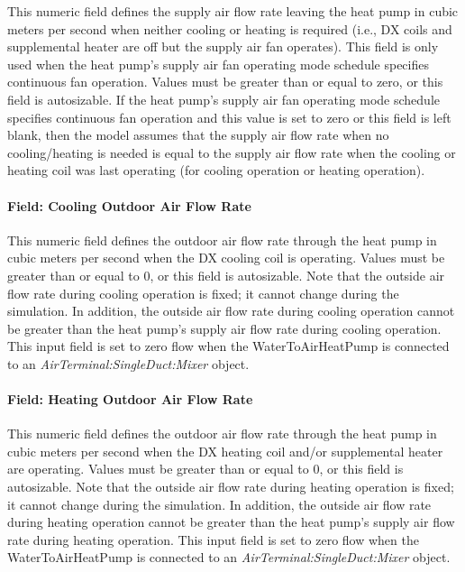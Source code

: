 This numeric field defines the supply air flow rate leaving the heat pump in cubic meters per second when neither cooling or heating is required (i.e., DX coils and supplemental heater are off but the supply air fan operates). This field is only used when the heat pump's supply air fan operating mode schedule specifies continuous fan operation. Values must be greater than or equal to zero, or this field is autosizable. If the heat pump's supply air fan operating mode schedule specifies continuous fan operation and this value is set to zero or this field is left blank, then the model assumes that the supply air flow rate when no cooling/heating is needed is equal to the supply air flow rate when the cooling or heating coil was last operating (for cooling operation or heating operation).

\paragraph{Field: Cooling Outdoor Air Flow Rate}\label{field-cooling-outdoor-air-flow-rate-2}

This numeric field defines the outdoor air flow rate through the heat pump in cubic meters per second when the DX cooling coil is operating. Values must be greater than or equal to 0, or this field is autosizable. Note that the outside air flow rate during cooling operation is fixed; it cannot change during the simulation. In addition, the outside air flow rate during cooling operation cannot be greater than the heat pump's supply air flow rate during cooling operation. This input field is set to zero flow when the WaterToAirHeatPump is connected to an \textit{AirTerminal:SingleDuct:Mixer} object.

\paragraph{Field: Heating Outdoor Air Flow Rate}\label{field-heating-outdoor-air-flow-rate-2}

This numeric field defines the outdoor air flow rate through the heat pump in cubic meters per second when the DX heating coil and/or supplemental heater are operating. Values must be greater than or equal to 0, or this field is autosizable. Note that the outside air flow rate during heating operation is fixed; it cannot change during the simulation. In addition, the outside air flow rate during heating operation cannot be greater than the heat pump's supply air flow rate during heating operation. This input field is set to zero flow when the WaterToAirHeatPump is connected to an \textit{AirTerminal:SingleDuct:Mixer} object.

